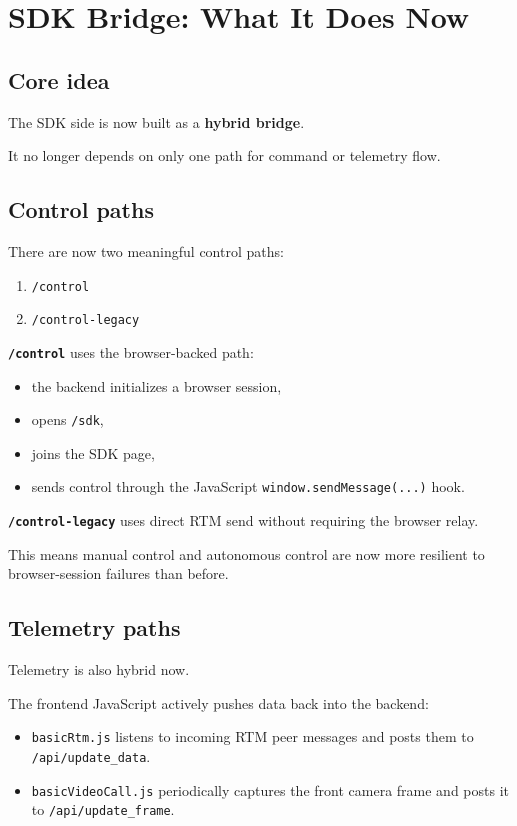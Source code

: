 \documentclass[11pt,a4paper]{article}
\begin{document}
\section{SDK Bridge: What It Does Now}

\subsection{Core idea}

The SDK side is now built as a \textbf{hybrid bridge}.

It no longer depends on only one path for command or telemetry flow.

\subsection{Control paths}

There are now two meaningful control paths:

\begin{enumerate}[nosep]
  \item \texttt{/control}
  \item \texttt{/control-legacy}
\end{enumerate}

\textbf{\texttt{/control}} uses the browser-backed path:
\begin{itemize}[nosep]
  \item the backend initializes a browser session,
  \item opens \texttt{/sdk},
  \item joins the SDK page,
  \item sends control through the JavaScript \texttt{window.sendMessage(...)} hook.
\end{itemize}

\textbf{\texttt{/control-legacy}} uses direct RTM send without requiring the
browser relay.

This means manual control and autonomous control are now more resilient to
browser-session failures than before.

\subsection{Telemetry paths}

Telemetry is also hybrid now.

The frontend JavaScript actively pushes data back into the backend:

\begin{itemize}[nosep]
  \item \texttt{basicRtm.js} listens to incoming RTM peer messages and posts them to \texttt{/api/update\_data}.
  \item \texttt{basicVideoCall.js} periodically captures the front camera frame and posts it to \texttt{/api/update\_frame}.
\end{itemize}
\end{document}
